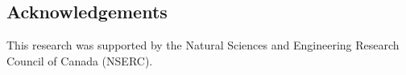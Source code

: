 \documentclass[oribibl]{llncs}
\begin{document}
\subsection*{Acknowledgements}

This research was supported by the Natural Sciences and Engineering Research Council of Canada (NSERC).




\end{document}
